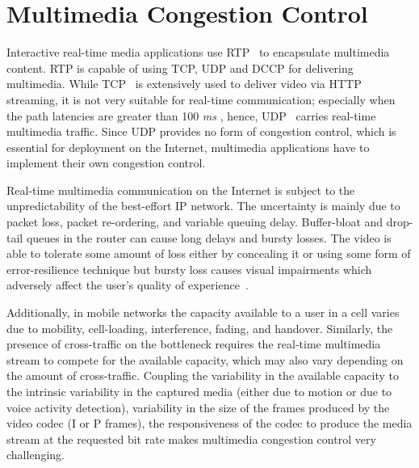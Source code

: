 


\section{Multimedia Congestion Control}

Interactive real-time media applications use RTP~\cite{rfc3550} to encapsulate
multimedia content. RTP is capable of using TCP, UDP and DCCP for delivering
multimedia.  While TCP~\cite{rfc793} is extensively used to deliver video via
HTTP streaming, it is not very suitable for real-time communication;
especially when the path latencies are greater than 100 \emph{ms} \cite{Brosh:tcp-real-time}, 
hence, UDP~\cite{rfc768} carries real-time multimedia traffic. Since
UDP provides no form of congestion control, which is essential for deployment
on the Internet, multimedia applications have to implement their own congestion control.

Real-time multimedia communication on the Internet is subject to the
unpredictability of the best-effort IP network. The uncertainty is mainly due
to packet loss, packet re-ordering, and variable queuing delay.  Buffer-bloat
\cite{gettys:bufferbloat} and drop-tail queues in the router  can cause long
delays and bursty losses. The video is able to tolerate some amount of loss
either by concealing it or using some form of error-resilience technique but
bursty loss causes visual impairments which adversely affect the user's
quality of experience~\cite{Zink03subjectiveimpression}.

Additionally, in mobile networks  the capacity available to a user in a cell
varies due to mobility, cell-loading, interference, fading, and handover.
Similarly, the presence of cross-traffic on the bottleneck requires the real-time 
multimedia stream to compete for the available capacity, which may also
vary depending on the amount of cross-traffic.  Coupling the variability in
the available capacity to  the intrinsic variability in the captured media
(either due to motion or due  to voice activity detection), variability in the
size of the frames produced  by the video codec (I or P frames), the
responsiveness of the codec to produce the media stream at the requested bit
rate makes multimedia congestion control very challenging.

